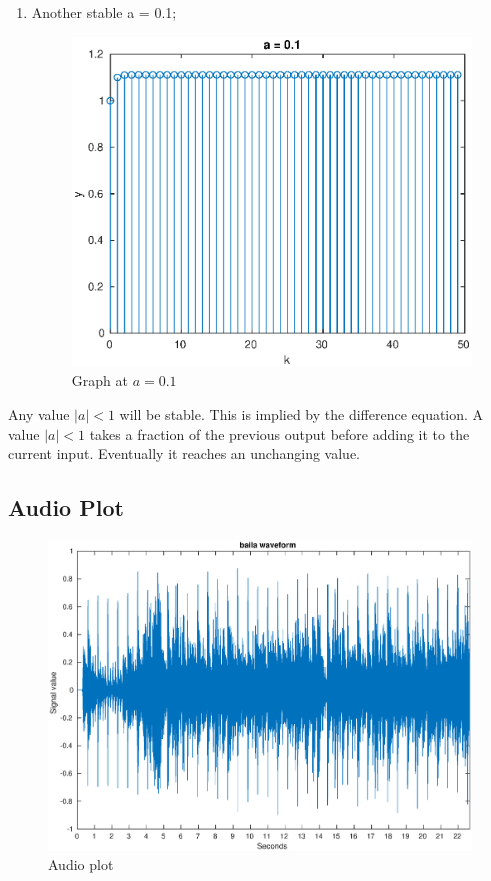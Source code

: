 \documentclass{article}
\begin{document}
\begin{multicols*}{2}
\begin{enumerate}
\begin{figure}[H]
                \end{figure}
          \item Another stable a = 0.1;
                \begin{figure}[H]
                     \centering
                     \includegraphics[width=\linewidth]{a1}
                     \caption{Graph at \(a=0.1\)}
                \end{figure}
     \end{enumerate}
     Any value \(|a| < 1\) will be stable. This is implied by the difference equation. A value \(|a| <1\) takes a fraction of the previous output before adding it to the current input. Eventually it reaches an unchanging value.

\end{multicols*}
\appendix
\begin{landscape}
     \section{Audio Plot}
     \begin{figure}[H]
          \centering
          \includegraphics{baila}
          \caption{Audio plot}
     \end{figure}
\end{landscape}
\end{document}
